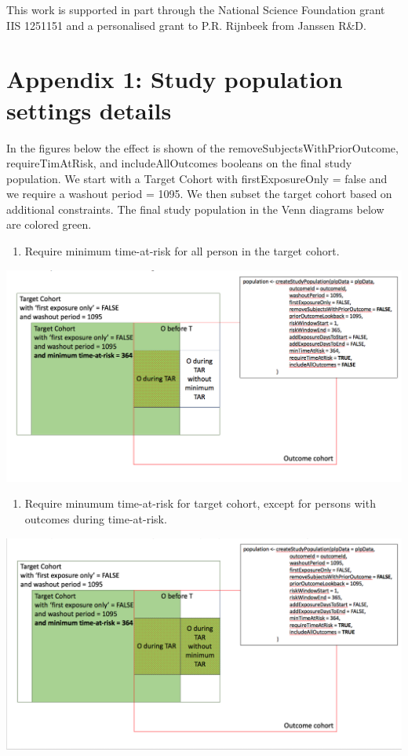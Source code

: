 \documentclass[]{book}
\providecommand{\tightlist}{%
  \setlength{\itemsep}{0pt}\setlength{\parskip}{0pt}}
\begin{document}
This work is supported in part through the National Science Foundation
grant IIS 1251151 and a personalised grant to P.R. Rijnbeek from Janssen
R\&D.

\newpage

\section*{Appendix 1: Study population settings
details}\label{appendix-1-study-population-settings-details}

In the figures below the effect is shown of the
removeSubjectsWithPriorOutcome, requireTimAtRisk, and includeAllOutcomes
booleans on the final study population. We start with a Target Cohort
with firstExposureOnly = false and we require a washout period = 1095.
We then subset the target cohort based on additional constraints. The
final study population in the Venn diagrams below are colored green.

\begin{enumerate}
\def\labelenumi{\arabic{enumi}.}
\tightlist
\item
  Require minimum time-at-risk for all person in the target cohort.
\end{enumerate}

\includegraphics[width=1\linewidth]{images/PatientLevelPrediction/popdef1}

\begin{enumerate}
\def\labelenumi{\arabic{enumi}.}
\setcounter{enumi}{1}
\tightlist
\item
  Require minumum time-at-risk for target cohort, except for persons
  with outcomes during time-at-risk.
\end{enumerate}

\includegraphics[width=1\linewidth]{images/PatientLevelPrediction/popdef2}
\end{document}
